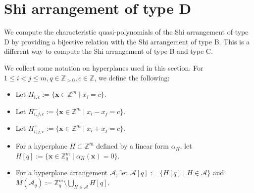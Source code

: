 \documentclass{article}
\theoremstyle{plain}
\theoremstyle{definition}
\theoremstyle{remark}
\numberwithin{equation}{section}
\newcommand{\Ac}{\mathcal{A}}
\newcommand{\ZZ}{\mathbb{Z}}
\newcommand{\RR}{\mathbb{R}}
\begin{document}
\section{Shi arrangement of type D}\label{sec-TypeD} 
We compute the characteristic quasi-polynomials of the Shi arrangement of type D by providing a bijective relation with the Shi arrangement of type B. 
This is a different way to compute the Shi arrangement of type B and type C. 

We collect some notation on hyperplanes used in this section. 
For $1 \leq i < j \leq m, q \in \ZZ_{>0}, c \in \ZZ$, we define the following:
    \begin{itemize}
        \item Let $H_{i,c} := \{\bm{x} \in \ZZ^m \mid x_i = c\}$.
        \item Let $H_{i,j,c}^- := \{\bm{x} \in \ZZ^m \mid x_i - x_j = c\}$.
        \item Let $H_{i,j,c}^+ := \{\bm{x} \in \ZZ^m \mid x_i + x_j= c\}$.
        \item For a hyperplane $H \subset \ZZ^m$ defined by a linear form $\alpha_H$, let $H[q] := \{\bm{x} \in \ZZ_q^m \mid \alpha_H(\bm{x}) = 0\}$. 
        \item For a hyperplane arrangement $\Ac$, let $\Ac[q] := \{H[q] \mid H \in \Ac\}$ and $M(\Ac_q):=\ZZ_q^m\setminus\bigcup_{H \in \Ac} H[q]$.
    \end{itemize}
\end{document}
